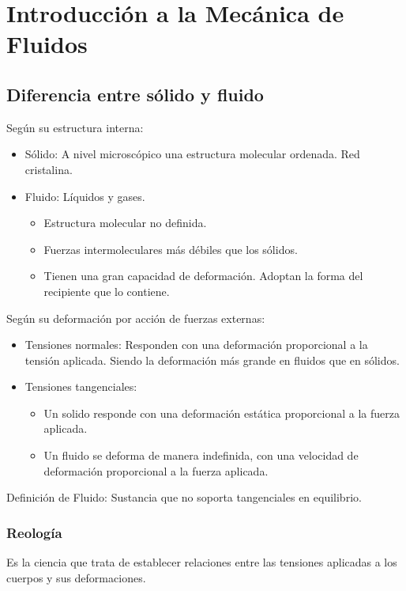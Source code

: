 \chapter{Introducción a la Mecánica de Fluidos}
\section{Diferencia entre sólido y fluido}
Según su estructura interna:
\begin{itemize}
    \item Sólido: A nivel microscópico una estructura molecular ordenada. Red cristalina.
    \item Fluido: Líquidos y gases.
    \begin{itemize}
        \item Estructura molecular no definida.
        \item Fuerzas intermoleculares más débiles que los sólidos.
        \item Tienen una gran capacidad de deformación. Adoptan la forma del recipiente que lo contiene.
    \end{itemize}
\end{itemize}

Según su deformación por acción de fuerzas externas:
\begin{itemize}
    \item Tensiones normales: Responden con una deformación proporcional a la tensión aplicada. Siendo la deformación más grande en fluidos que en sólidos.
    \item Tensiones tangenciales:
    \begin{itemize}
        \item Un solido responde con una deformación estática proporcional a la fuerza aplicada.
        \item Un fluido se deforma de manera indefinida, con una velocidad de deformación proporcional a la fuerza aplicada.
    \end{itemize}
\end{itemize}

Definición de Fluido: Sustancia que no soporta tangenciales en equilibrio.

\subsection{Reología}
Es la ciencia que trata de establecer relaciones entre las tensiones aplicadas a los cuerpos y sus deformaciones. 

